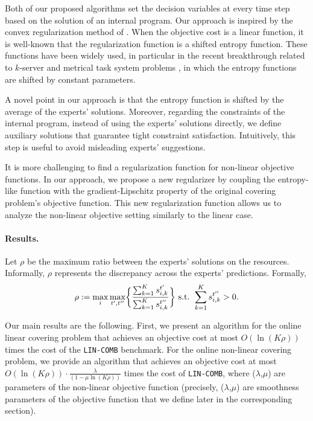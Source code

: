 Both of our proposed algorithms set the decision variables at every time step based on the solution of an internal program. Our approach is inspired by the
convex regularization method of \cite{BuchbinderChen14:Competitive-Analysis}.
When the objective cost is a linear function, it is well-known that the regularization function is a shifted entropy function.
These functions have been widely used, in particular in the recent breakthrough related to $k$-server \cite{BubeckCohen18:K-server-via-multiscale,BuchbinderGupta19:k-servers-with}
and metrical task system problems \cite{BubeckCohen21:Metrical-task},
in which the entropy functions are shifted by constant parameters.

A novel point in our approach is that the entropy function is shifted by the average of the experts' solutions.
Moreover, regarding the constraints of the internal program, instead of using the experts' solutions directly,
we define auxiliary solutions that guarantee tight constraint satisfaction.
Intuitively, this step is useful to avoid misleading experts' suggestions.

It is more challenging to find a regularization function for non-linear objective functions.
In our approach, we propose a new regularizer by coupling the entropy-like function with the gradient-Lipschitz property of the original covering problem's objective function.
This new regularization function allows us to analyze the non-linear objective setting similarly to the linear case.

\paragraph{Results.} Let $\rho$ be the maximum ratio between the experts' solutions on the resources.
Informally, $\rho$ represents the discrepancy across the experts' predictions.
Formally,
\[
	\rho := \max_{i} \max_{t',t''} \biggl\{\frac{\sum_{k=1}^{K} s_{i,k}^{t'}}{\sum_{k=1}^{K} s_{i,k}^{t''}} \biggr\}  \textnormal{ s.t. } \sum_{k=1}^{K} s_{i,k}^{t''} > 0.
\]

Our main results are the following.
First, we present an algorithm for the online linear covering problem that achieves an objective cost at most $O(\ln(K\rho))$ times the cost of the \texttt{LIN-COMB} benchmark.
For the online non-linear covering problem, we provide an algorithm that achieves an objective cost at most $O(\ln(K\rho)) \cdot \frac{\lambda}{(1-\mu\ln(K\rho))}$ times the cost of \texttt{LIN-COMB}, where ($\lambda$,$\mu$) are parameters of the non-linear objective function (precisely, ($\lambda$,$\mu$) are smoothness parameters of the objective function that we define later in the corresponding section).

